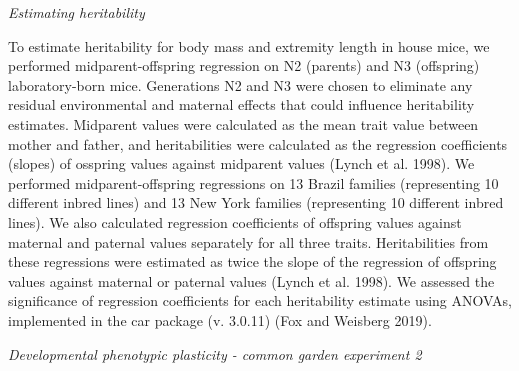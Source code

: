 \documentclass[
]{article}
\begin{document}
\noindent\emph{Estimating heritability}

To estimate heritability for body mass and extremity length in house
mice, we performed midparent-offspring regression on N2 (parents) and N3
(offspring) laboratory-born mice. Generations N2 and N3 were chosen to
eliminate any residual environmental and maternal effects that could
influence heritability estimates. Midparent values were calculated as
the mean trait value between mother and father, and heritabilities were
calculated as the regression coefficients (slopes) of osspring values
against midparent values (Lynch et al. 1998). We performed
midparent-offspring regressions on 13 Brazil families (representing 10
different inbred lines) and 13 New York families (representing 10
different inbred lines). We also calculated regression coefficients of
offspring values against maternal and paternal values separately for all
three traits. Heritabilities from these regressions were estimated as
twice the slope of the regression of offspring values against maternal
or paternal values (Lynch et al. 1998). We assessed the significance of
regression coefficients for each heritability estimate using ANOVAs,
implemented in the car package (v. 3.0.11) (Fox and Weisberg 2019).

\vspace{3.5mm}

\noindent\emph{Developmental phenotypic plasticity - common garden
experiment 2}
\end{document}
